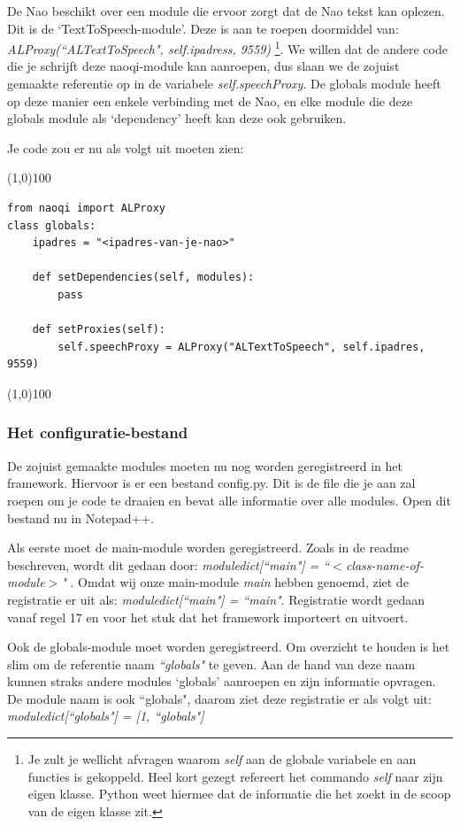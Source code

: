 \documentclass[a4paper, twoside]{article}
\begin{document}
De Nao beschikt over een module die ervoor zorgt dat de Nao tekst kan oplezen. Dit is de `TextToSpeech-module'. Deze is aan te roepen doormiddel van: \textit{ALProxy(``ALTextToSpeech", self.ipadress, 9559)} \footnote{Je zult je wellicht afvragen waarom \textit{self} aan de globale variabele en aan functies is gekoppeld. Heel kort gezegt refereert het commando \textit{self} naar zijn eigen klasse. Python weet hiermee dat de informatie die het zoekt in de scoop van de eigen klasse zit.}. We willen dat de andere code die je schrijft deze naoqi-module kan aanroepen, dus slaan we de zojuist gemaakte referentie op in de variabele \textit{self.speechProxy}. De globals module heeft op deze manier een enkele verbinding met de Nao, en elke module die deze globals module als `dependency' heeft kan deze ook gebruiken.

Je code zou er nu als volgt uit moeten zien:

\noindent \line(1,0){100}
\begin{verbatim}
from naoqi import ALProxy
class globals:
    ipadres = "<ipadres-van-je-nao>"

    def setDependencies(self, modules):
        pass

    def setProxies(self):
        self.speechProxy = ALProxy("ALTextToSpeech", self.ipadres, 9559)
\end{verbatim}
\noindent \line(1,0){100}

\subsubsection{Het configuratie-bestand}
De zojuist gemaakte modules moeten nu nog worden geregistreerd in het framework. Hiervoor is er een bestand config.py. Dit is de file die je aan zal roepen om je code te draaien en bevat alle informatie over alle modules. Open dit bestand nu in Notepad++.

Als eerste moet de main-module worden geregistreerd. Zoals in de readme beschreven, wordt dit gedaan door:
 \textit{moduledict[``main"] = ``$<$class-name-of-module$>$" }. 
Omdat wij onze main-module \textit{main} hebben genoemd, ziet de registratie er uit als: \textit{moduledict[``main"] = ``main"}.
Registratie wordt gedaan vanaf regel 17 en voor het stuk dat het framework importeert en uitvoert.

Ook de globals-module moet worden geregistreerd. Om overzicht te houden is het slim om de referentie naam \textit{``globals"} te geven. Aan de hand van deze naam kunnen straks andere modules `globals' aanroepen en zijn informatie opvragen. De module naam is ook ``globals", daarom ziet deze registratie er als volgt uit: \textit{moduledict[``globals"] = [1, ``globals"]}
\end{document}
